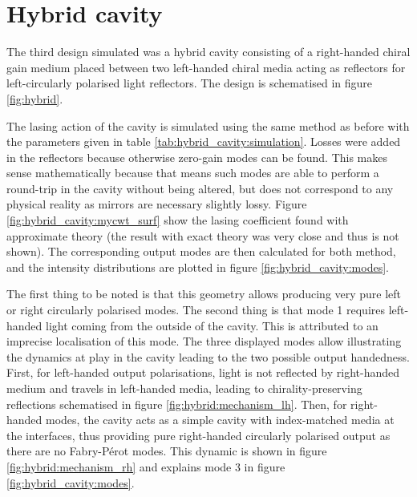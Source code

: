 \section{Hybrid cavity}

The third design simulated was a hybrid cavity consisting of a right-handed chiral gain medium placed between two left-handed chiral media acting as reflectors for left-circularly polarised light reflectors. The design is schematised in figure \ref{fig:hybrid}.

The lasing action of the cavity is simulated using the same method as before with the parameters given in table \ref{tab:hybrid_cavity:simulation}. Losses were added in the reflectors because otherwise zero-gain modes can be found. This makes sense mathematically because that means such modes are able to perform a round-trip in the cavity without being altered, but does not correspond to any physical reality as mirrors are necessary slightly lossy. Figure \ref{fig:hybrid_cavity:mycwt_surf} show the lasing coefficient found with approximate theory (the result with exact theory was very close and thus is not shown). The corresponding output modes are then calculated for both method, and the intensity distributions are plotted in figure \ref{fig:hybrid_cavity:modes}.

The first thing to be noted is that this geometry allows producing very pure left or right circularly polarised modes. The second thing is that mode 1 requires left-handed light coming from the outside of the cavity. This is attributed to an imprecise localisation of this mode. The three displayed modes allow illustrating the dynamics at play in the cavity leading to the two possible output handedness. First, for left-handed output polarisations, light is not reflected by right-handed medium and travels in left-handed media, leading to chirality-preserving reflections schematised in figure \ref{fig:hybrid:mechanism_lh}. Then, for right-handed modes, the cavity acts as a simple cavity\cite{topf_modes_2014} with index-matched media at the interfaces, thus providing pure right-handed circularly polarised output as there are no Fabry-Pérot modes. This dynamic is  shown in figure \ref{fig:hybrid:mechanism_rh} and explains mode 3 in figure \ref{fig:hybrid_cavity:modes}.


